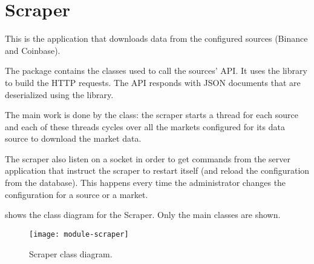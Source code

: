 \section{Scraper}\label{sec:scraper}

This is the application that downloads data from the configured sources (Binance
and Coinbase).

The  package contains the classes used to call the sources' API\@. It
uses the  library to build the HTTP requests. The API responds
with JSON documents that are deserialized using the  library.

The main work is done by the  class: the scraper starts a thread
for each source and each of these threads cycles over all the markets configured
for its data source to download the market data.

The scraper also listen on a socket in order to get commands from the server
application that instruct the scraper to restart itself (and reload the
configuration from the database). This happens every time the administrator
changes the configuration for a source or a market.

 shows the class diagram for the Scraper. Only the main
classes are shown.

\begin{figure}[htb]
	\texttt{[image: module-scraper]}
	\caption{Scraper class diagram.}\label{fig:scraper}
\end{figure}
